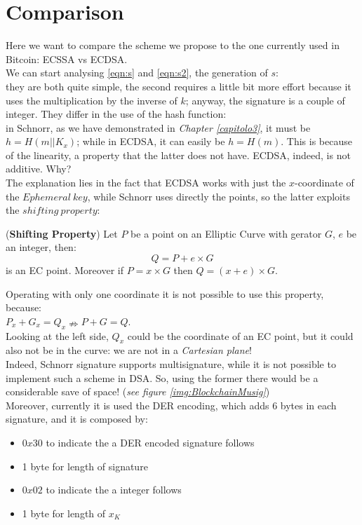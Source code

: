 \section{Comparison}
Here we want to compare the scheme we propose to the one currently used in Bitcoin: ECSSA vs ECDSA.\\
We can start analysing \eqref{eqn:s} and \eqref{eqn:s2}, the generation of $s$:\\
they are both quite simple, the second requires a little bit more effort because it uses the multiplication by the inverse of $k$; anyway, the signature is a couple of integer. They differ in the use of the hash function:\\
in Schnorr, as we have demonstrated in \textit{Chapter \eqref{capitolo3}}, it must be $h=H(m||K_{x})$; while in ECDSA, it can easily be $h=H(m)$. This is because of the linearity, a property that the latter does not have. ECDSA, indeed, is not additive. Why?\\
The explanation lies in the  fact that ECDSA works with just the $x$-coordinate of the $Ephemeral\ key$, while Schnorr uses directly the points, so the latter exploits the $shifting\ property$:
\begin{teorema}{(\textbf{Shifting Property})}
	Let $P$ be a point on an Elliptic Curve with gerator $G$, $e$ be an integer, then:
	\begin{equation*}
	Q=P+e\times G
	\end{equation*}
	is an EC point. Moreover if $P = x \times G$ then $Q=(x+e) \times G$.
\end{teorema}
Operating with only one coordinate it is not possible to use this property, because:\\
$P_{x}+G_{x}=Q_{x} \nRightarrow P+G=Q$.\\
Looking at the left side, $Q_{x}$ could be the coordinate of an EC point, but it could also not be in the curve: we are not in a \textit{Cartesian plane}!\\
Indeed, Schnorr signature supports multisignature, while it is not possible to implement such a scheme in DSA. So, using the former there would be a considerable save of space! (\textit{see figure \eqref{img:BlockchainMusig}})\\
Moreover, currently it is used the DER encoding, which adds 6 bytes in each signature, and it is composed by:
\begin{itemize}
	\item $0x30$ to indicate the a DER encoded signature follows
	\item 1 byte for length of signature
	\item $0x02$ to indicate the a integer follows
	\item 1 byte for length of $x_{K}$
\end{itemize}
